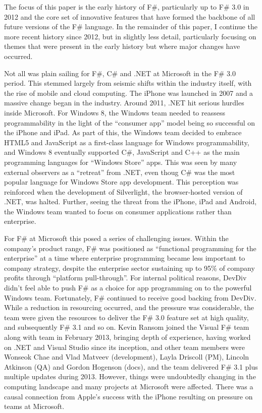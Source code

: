 \documentclass[acmsmall,screen]{acmart}
\begin{document}
The focus of this paper is the early history of F\#, particularly up to F\# 3.0 in 2012 and the core set of innovative
features that have formed the backbone of all future versions of the F\# language. In the remainder of this paper, I
continue the more recent history since 2012, but in slightly less detail, particularly focusing on themes that were
present in the early history but where major changes have occurred.

Not all was plain sailing for F\#, C\# and .NET at Microsoft in the F\# 3.0 period.  This stemmed largely from seismic
shifts within the industry itself, with the rise of mobile and cloud computing.  The iPhone was launched in 2007 and a
massive change began in the industry. Around 2011, .NET hit serious hurdles inside Microsoft. For Windows 8, the
Windows team needed to reassess programmability in the light of the “consumer app” model being so successful on the
iPhone and iPad. As part of this, the Windows team decided to embrace HTML5 and JavaScript as a first-class language
for Windows programmability, and Windows 8 eventually supported C\#, JavaScript and C++ as the main programming
languages for “Windows Store” apps.  This was seen by many external observers as a “retreat” from .NET, even thoug
 C\# was the most popular language for Windows Store app development. This perception was reinforced when the
development of Silverlight, the browser-hosted version of .NET, was halted. Further, seeing the threat from the iPhone,
iPad and Android, the Windows team wanted to focus on consumer applications rather than enterprise.  

For F\# at Microsoft this posed a series of challenging issues. Within the company’s product range, F\# was positioned
as “functional programming for the enterprise” at a time where enterprise programming became less important to company
strategy, despite the enterprise sector sustaining up to 95\% of company profits through “platform pull-through”. For internal
political reasons, DevDiv didn’t feel able to push F\# as a choice for app programming on to the powerful Windows team.
Fortunately, F\# continued to receive good backing from DevDiv. While a reduction in resourcing occurred, and the pressure
was considerable, the team were given the resources to deliver the F\# 3.0 feature set at high quality, and
subsequently F\# 3.1 and so on.  Kevin Ransom joined the Visual F\# team along with team in February 2013, bringing depth of experience, having
worked on .NET and Visual Studio since its inception, and other team members were Wonseok Chae and Vlad Matveev (development), Layla Driscoll (PM),
Lincoln Atkinson (QA) and Gordon Hogenson (docs), and the team delivered F\# 3.1 plus multiple updates during 2013.
However, things were undoubtedly changing in the computing landscape and many
projects at Microsoft were affected. There was a causal connection from Apple's success with the iPhone resulting on pressure
on teams at Microsoft.  
\end{document}
